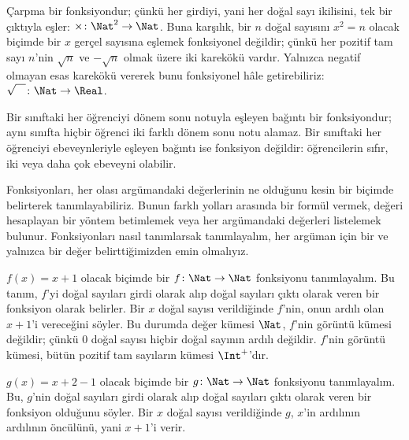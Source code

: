 \documentclass[../../../include/open-logic-section]{subfiles}
\begin{document}
\begin{ex}
Çarpma bir fonksiyondur; çünkü her girdiyi, yani her doğal sayı ikilisini,
tek bir çıktıyla eşler: $\times \colon \Nat^2 \to \Nat$. Buna karşılık, bir
$n$ doğal sayısını $x^2=n$ olacak biçimde bir $x$ gerçel sayısına eşlemek
fonksiyonel değildir; çünkü her pozitif tam sayı $n$'nin $\sqrt{n}$ ve
$-\sqrt{n}$ olmak üzere iki karekökü vardır. Yalnızca negatif olmayan esas
karekökü vererek bunu fonksiyonel hâle getirebiliriz:
$\sqrt{\phantom{X}} \colon \Nat \to \Real$.
\end{ex}

\begin{ex}
Bir sınıftaki her öğrenciyi dönem sonu notuyla eşleyen bağıntı bir
fonksiyondur; aynı sınıfta hiçbir öğrenci iki farklı dönem sonu notu alamaz.
Bir sınıftaki her öğrenciyi ebeveynleriyle eşleyen bağıntı ise fonksiyon
değildir: öğrencilerin sıfır, iki veya daha çok ebeveyni olabilir.
\end{ex}

\begin{explain}
Fonksiyonları, her olası argümandaki değerlerinin ne olduğunu kesin bir
biçimde belirterek tanımlayabiliriz. Bunun farklı yolları arasında bir formül
vermek, değeri hesaplayan bir yöntem betimlemek veya her argümandaki değerleri
listelemek bulunur. Fonksiyonları nasıl tanımlarsak tanımlayalım, her argüman
için bir ve yalnızca bir değer belirttiğimizden emin olmalıyız.
\end{explain}


\begin{ex}
$f(x)=x+1$ olacak biçimde bir $f \colon \Nat \to \Nat$ fonksiyonu
tanımlayalım. Bu tanım, $f$'yi doğal sayıları girdi olarak alıp doğal sayıları
çıktı olarak veren bir fonksiyon olarak belirler. Bir $x$ doğal sayısı
verildiğinde $f$'nin, onun ardılı olan $x+1$'i vereceğini söyler.
Bu durumda değer kümesi $\Nat$, $f$'nin görüntü kümesi değildir; çünkü $0$
doğal sayısı hiçbir doğal sayının ardılı değildir. $f$'nin görüntü kümesi,
bütün pozitif tam sayıların kümesi $\Int^{+}$'dır.
\end{ex}

\begin{ex}
$g(x)=x+2-1$ olacak biçimde bir $g \colon \Nat \to \Nat$ fonksiyonu
tanımlayalım. Bu, $g$'nin doğal sayıları girdi olarak alıp doğal sayıları
çıktı olarak veren bir fonksiyon olduğunu söyler. Bir $x$ doğal sayısı
verildiğinde $g$, $x$'in ardılının ardılının öncülünü, yani $x+1$'i verir.
\end{ex}
\end{document}
